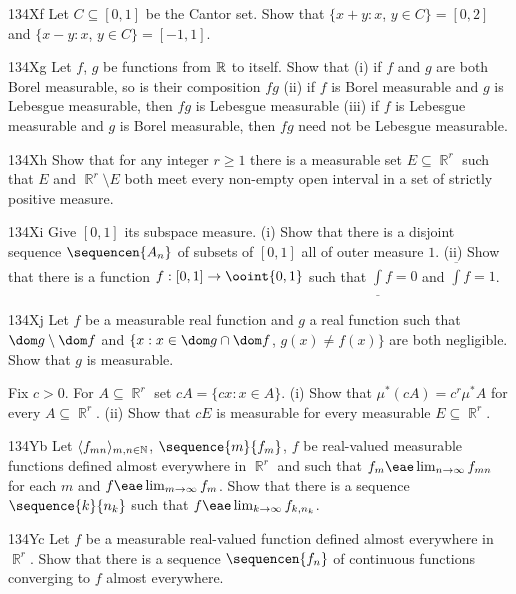 {\spheader 134Xf Let $C\subseteq[0,1]$ be the Cantor set.   Show that
$\{x+y:x$, $y\in C\}=[0,2]$ and $\{x-y:x$, $y\in C\}=[-1,1]$.
     
\spheader 134Xg Let $f$, $g$ be functions from $\Bbb R$ to
itself.   Show that (i) if $f$ and $g$ are both Borel measurable, so is
their composition $fg$ (ii) if $f$ is Borel measurable and $g$ is
Lebesgue measurable, then $fg$ is Lebesgue measurable (iii) if $f$ is
Lebesgue measurable and $g$ is Borel measurable, then $fg$ need not be
Lebesgue measurable.
     
\spheader 134Xh Show that for any integer $r\ge 1$
there is a measurable set $E\subseteq\BbbR^r$ such that $E$
and $\BbbR^r\setminus E$ both meet every non-empty open interval in a
set of strictly positive measure.
     
\spheader 134Xi Give $[0,1]$ its subspace measure.   (i) Show that there
is a disjoint sequence $\sequencen{A_n}$ of subsets of $[0,1]$ all of
outer measure $1$.
(ii) Show that there is a function $f:[0,1]\to\ooint{0,1}$ such that
$\underline{\int}f=0$ and $\overline{\int}f=1$.
     
\spheader 134Xj Let $f$ be a measurable real function and $g$ a
real function such that $\dom g\setminus\dom f$ and 
$\{x:x\in\dom g\cap\dom f$, $g(x)\ne f(x)\}$ are both negligible.   
Show that $g$ is measurable.

Fix $c>0$.  For $A\subseteq\BbbR^r$ set
$cA=\{cx:x\in A\}$.   (i) Show that $\mu^*(cA)=c^r\mu^*A$ for every
$A\subseteq\BbbR^r$.   (ii) Show that $cE$ is measurable for every
measurable $E\subseteq\BbbR^r$.
     
\spheader 134Yb Let $\langle f_{mn}\rangle_{m,n\in\Bbb N}$,
$\sequence{m}{f_m}$, $f$ be real-valued measurable functions defined
almost everywhere in $\BbbR^r$ and such that
$f_m\eae\lim_{n\to\infty}f_{mn}$ for each $m$ and
$f\eae\lim_{m\to\infty}f_m$.   Show that there is a sequence
$\sequence{k}{n_k}$ such that $f\eae\lim_{k\to\infty}f_{k,n_k}$.
     
\spheader 134Yc Let $f$ be a measurable real-valued function
defined almost
everywhere in $\BbbR^r$.   Show that there is a sequence
$\sequencen{f_n}$ of continuous functions converging to $f$ almost
everywhere.   
     
}
